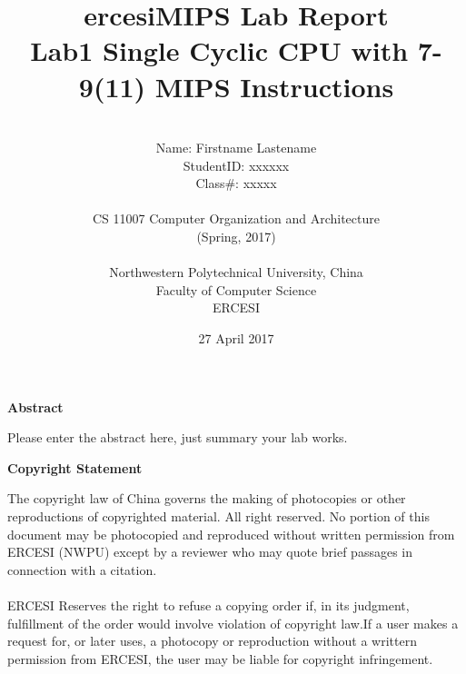 \documentclass[a4paper]{article}
\begin{document}
\title{{\Huge ercesiMIPS Lab Report{\large\linebreak\\}}{\Large Lab1 Single Cyclic CPU with 7-9(11) MIPS Instructions\linebreak\linebreak}}
\author{\\Name: Firstname Lastename\\
StudentID: xxxxxx\\
Class\#: xxxxx\\\\
CS 11007 Computer Organization and Architecture\\
(Spring, 2017)\\\\
Northwestern Polytechnical University, China\\
Faculty of Computer Science\\
ERCESI}
\date{27 April 2017}
\maketitle
\newpage

\begin{center}
{\large\bf{Abstract\\}}
\end{center}
Please enter the abstract here, just summary your lab works.
\newpage
\begin{center}
{\large\bf{Copyright Statement\\}}
\end{center}
The copyright law of China governs the making of photocopies or other reproductions of copyrighted material. All right reserved. No portion of this document may be photocopied and reproduced without written permission from ERCESI (NWPU) except by a reviewer who may quote brief passages in connection with a citation. \\\\
ERCESI Reserves the right to refuse a copying order if, in its judgment, fulfillment of the order would involve violation of copyright law.If a user makes a request for, or later uses, a photocopy or reproduction without a writtern permission from ERCESI, the user may be liable for copyright infringement.\newpage
\tableofcontents\label{c}
\newpage
\end{document}
